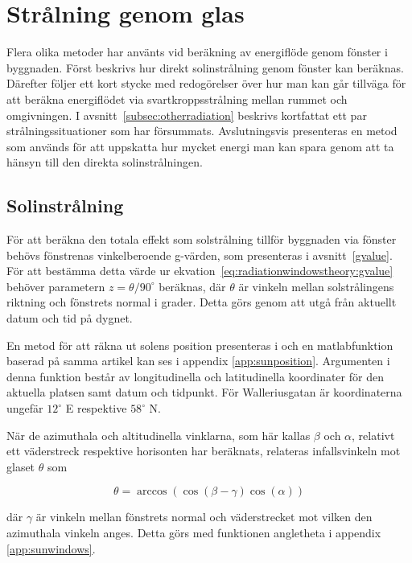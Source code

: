 \section{Strålning genom glas}\label{sec:sunthroughwindowsmethod}

Flera olika metoder har använts vid beräkning av energiflöde genom fönster i byggnaden. Först beskrivs hur direkt solinstrålning genom fönster kan beräknas. Därefter följer ett kort stycke med redogörelser över hur man kan går tillväga för att beräkna energiflödet via svartkroppsstrålning mellan rummet och omgivningen. I avsnitt~\ref{subsec:otherradiation} beskrivs kortfattat ett par strålningssituationer som har försummats. Avslutningsvis presenteras en metod som används för att uppskatta hur mycket energi man kan spara genom att ta hänsyn till den direkta solinstrålningen.

\subsection{Solinstrålning}
För att beräkna den totala effekt som solstrålning tillför byggnaden via fönster behövs fönstrenas vinkelberoende g-värden, som presenteras i avsnitt~\ref{gvalue}. För att bestämma detta värde ur ekvation~\eqref{eq:radiationwindowstheory:gvalue} behöver parametern $z = \theta/90^\circ$ beräknas, där $\theta$ är vinkeln mellan solstrålingens riktning och fönstrets normal i grader. Detta görs genom att utgå från aktuellt datum och tid på dygnet.

En metod för att räkna ut solens position presenteras i \cite{walraven78} och en matlabfunktion baserad på samma artikel kan ses i appendix \ref{app:sunposition}. Argumenten i denna funktion består av longitudinella och latitudinella koordinater för den aktuella platsen samt datum och tidpunkt. För Walleriusgatan är koordinaterna ungefär $12^\circ$ E respektive $58^\circ$ N.

När de azimuthala och altitudinella vinklarna, som här kallas $\beta$ och $\alpha$, relativt ett väderstreck respektive horisonten har beräknats, relateras infallsvinkeln mot glaset $\theta$ som

\begin{equation} 
\theta = \arccos{\left( \cos{\left(\beta - \gamma\right)}\cos{\left(\alpha\right)}\right)}
\end{equation}

där $\gamma$ är vinkeln mellan fönstrets normal och väderstrecket mot vilken den azimuthala vinkeln anges. Detta görs med funktionen angletheta i appendix \ref{app:sunwindows}.

